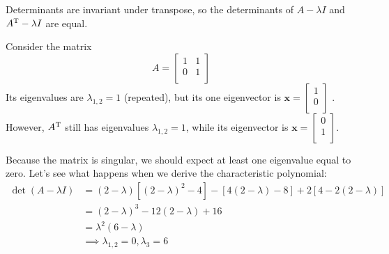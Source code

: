 \documentclass[a4paper]{article}
\begin{document}
Determinants are invariant under transpose, so the determinants of \(A - \lambda I\) and \(A^{\textsc{T}} - \lambda I\) are equal.

Consider the matrix
\[
	A = 
	\begin{bmatrix}
		1 & 1 \\
		0 & 1 \\
	\end{bmatrix}
\]
Its eigenvalues are \(\lambda_{1,2} = 1\) (repeated), but its one eigenvector is \(\bm{x} = 
\begin{bmatrix}
	1 \\
	0 \\
\end{bmatrix}
\) . However, \(A^{\textsc{T}}\) still has eigenvalues \(\lambda_{1,2} = 1\), while its eigenvector is \(
\bm{x} =
\begin{bmatrix}
	0 \\
	1 \\
\end{bmatrix}
\).


Because the matrix is singular, we should expect at least one eigenvalue equal to zero. Let's see what happens when we derive the characteristic polynomial:
\begin{align*}
	\det \!\left( A - \lambda I \right) & = \!\left( 2 - \lambda  \right) \!\left[ \!\left( 2 - \lambda  \right)^{2} - 4 \right] - \!\left[ 4 \!\left( 2 - \lambda  \right) - 8 \right] + 2 \!\left[ 4 - 2 \!\left( 2 - \lambda  \right)  \right] \\
			& = \!\left( 2 - \lambda  \right)^{3} - 12 \!\left( 2 - \lambda  \right) + 16 \\
			& = \lambda^{2} \!\left( 6 - \lambda  \right)  \\
			& \implies \lambda_{1,2} = 0, \lambda_{3} = 6 
\end{align*}
\end{document}

